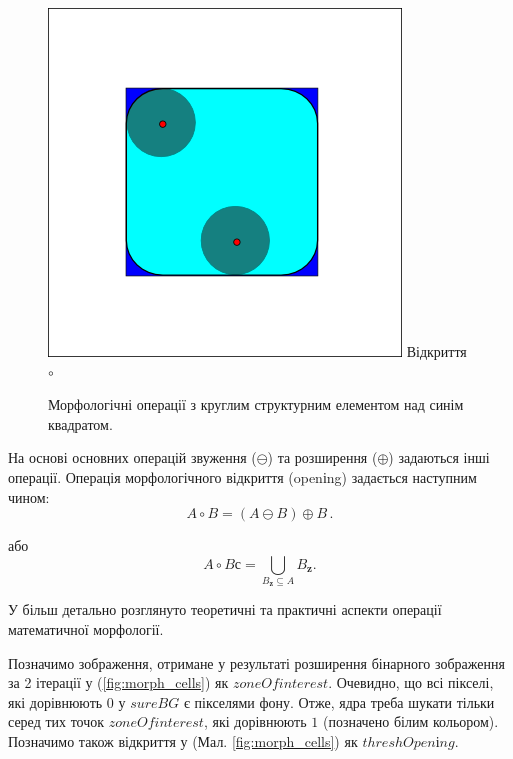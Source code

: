 \begin{figure}[t!]
	\includegraphics[width=0.80\linewidth]{Figures/Chapter2/Opening.png}
	Відкриття \(\circ\)
	\endminipage\hfill
	
	\caption{Морфологічні операції з круглим структурним елементом над синім квадратом.}
	\label{fig:morphology_explained}
\end{figure}

На основі основних операцій звуження (\(\ominus\)) та розширення (\(\oplus\)) задаються інші операції. Операція морфологічного відкриття (openіng) задається наступним чином:
\begin{equation*}
A \circ B  = (A \ominus B) \oplus B\,.
\end{equation*}

або
\begin{equation*}
A \circ Bс = \mathop\bigcup\limits_{B_{{\textbf{z}}}\subseteq A} {B_{{\textbf{z}}}}.
\end{equation*}

У \citep{book:serra} більш детально розглянуто теоретичні та практичні аспекти операції математичної морфології.

Позначимо зображення, отримане у результаті розширення бінарного зображення за 2 ітерації у (\ref{fig:morph_cells}) як \(zoneOfinterest\). Очевидно, що всі пікселі, які дорівнюють \(0\) у \(sureBG\) є пікселями фону. Отже, ядра треба шукати тільки серед тих точок \(zoneOfinterest\), які дорівнюють \(1\) (позначено білим кольором). Позначимо також відкриття у (Мал. \ref{fig:morph_cells}) як \(threshOpenіng\).

